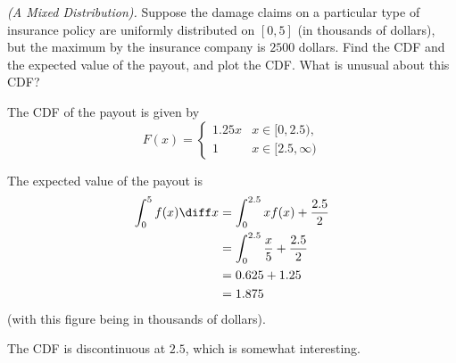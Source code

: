 \begin{problem}[Handout 12, \# 18]
  \emph{(A Mixed Distribution).} Suppose the damage claims on a particular
  type of insurance policy are uniformly distributed on \([0,5]\) (in
  thousands of dollars), but the maximum by the insurance company is
  \(2500\) dollars. Find the CDF and the expected value of the payout, and
  plot the CDF. What is unusual about this CDF?
\end{problem}
\begin{solution}
  The CDF of the payout is given by
  \[
    F(x) =
    \begin{cases}
      1.25x& x \in [0,2.5),\\
      1& x \in [2.5, \infty)
    \end{cases}
  \]

  The expected value of the payout is
  \begin{align*}
    \int_0^5 f(x) \diff x &= \int_0^{2.5} xf(x) + \frac{2.5}{2} \\
                          &= \int_0^{2.5} \frac{x}{5}+\frac{2.5}{2} \\
                          &= 0.625 + 1.25 \\
                          &= 1.875
  \end{align*}
  (with this figure being in thousands of dollars).

  The CDF is discontinuous at $2.5$, which is somewhat interesting.
\end{solution}
\newpage

